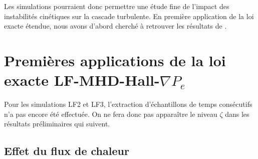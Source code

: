Les simulations  pourraient donc permettre une étude fine de l'impact des instabilités cinétiques sur la cascade turbulente. En première application de la loi exacte étendue, nous avons d'abord cherché à retrouver les résultats de \cite{ferrand_fluid_2021}. 

\section{Premières applications de la loi exacte LF-MHD-Hall-\ensuremath{\nabla P_e}}
\label{sec-343}

Pour les simulations LF2 et LF3, l'extraction d'échantillons de temps consécutifs n'a pas encore été effectuée. On ne fera donc pas apparaître le niveau $\zeta$ dans les résultats préliminaires qui suivent.

\subsection{Effet du flux de chaleur}

